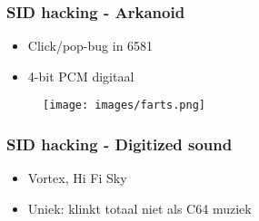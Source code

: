 
\begin{frame}
\frametitle{SID hacking - Arkanoid}

\begin{itemize}
\item Click/pop-bug in 6581
\item 4-bit PCM digitaal
\end{itemize}

\begin{figure}
\texttt{[image: images/farts.png]}
\end{figure}

\end{frame}


\begin{frame}
\frametitle{SID hacking - Digitized sound}

\begin{itemize}
\item Vortex, Hi Fi Sky
\item Uniek: klinkt totaal niet als C64 muziek
\end{itemize} 

\end{frame}
